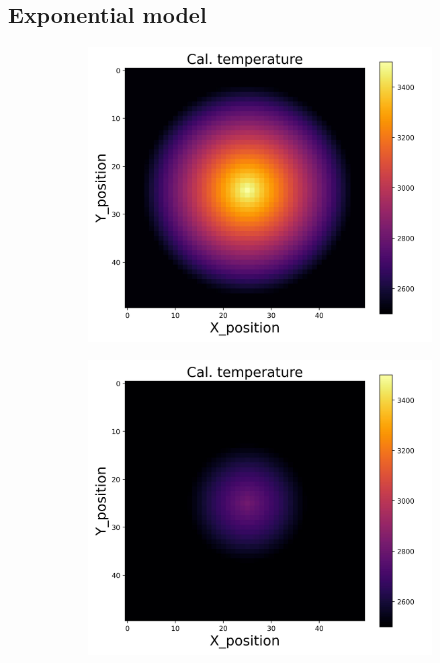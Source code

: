 {\newpage
\subsection{Exponential model}
\begin{figure}[h]
    \centering
    \begin{minipage}{\textwidth}
        \centering
        \begin{subfigure}{0.27\textwidth}
            \centering
            \includegraphics[width=\textwidth]{figures/raw_data/0/T3500/exp/T_cal.jpg}
        \end{subfigure}
        \begin{subfigure}{0.27\textwidth}
            \centering
            \includegraphics[width=\textwidth]{figures/raw_data/5/T3500/exp/T_cal.jpg}

\end{subfigure}
\end{minipage}
\end{figure}}
